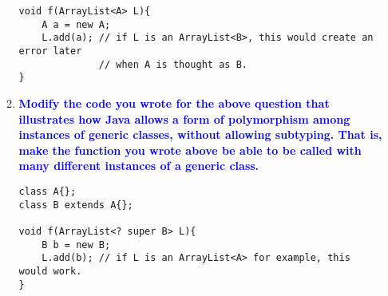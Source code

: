 \documentclass[10pt]{article}
\begin{document}
\begin{enumerate}
\begin{enumerate}
\begin{verbatim}
void f(ArrayList<A> L){
    A a = new A;
    L.add(a); // if L is an ArrayList<B>, this would create an error later 
              // when A is thought as B.
}
            \end{verbatim}
        \item \textbf{\textcolor{blue}{Modify the code you wrote for the above question that illustrates how Java allows a form of polymorphism among instances of generic classes, without allowing subtyping. That is, make the function you wrote above be able to be called with many different instances of a generic class.}}
            \begin{verbatim}
class A{};
class B extends A{};

void f(ArrayList<? super B> L){
    B b = new B;
    L.add(b); // if L is an ArrayList<A> for example, this would work.
}
            \end{verbatim}
    \end{enumerate}
    

\end{enumerate}
\end{document}
